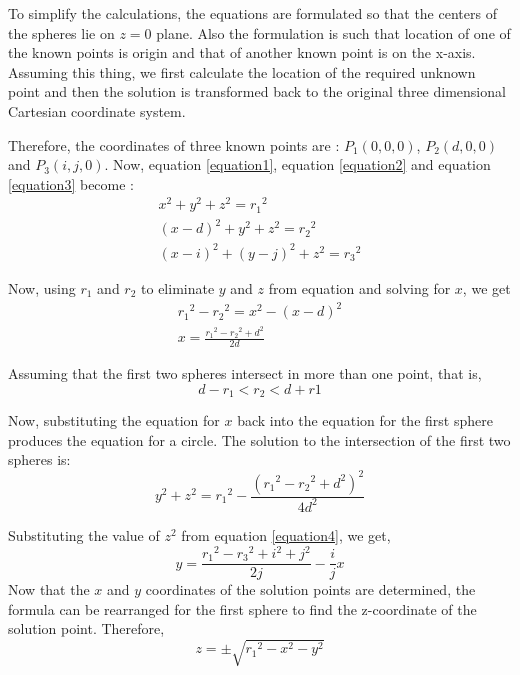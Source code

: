 To simplify the calculations, the equations are formulated so that the centers of the spheres lie on $z=0$ plane. Also the formulation is such that location of one of the known points is origin and that of another known point is on the x-axis. Assuming this thing, we first calculate the location of the required unknown point and then the solution is transformed back to the original three dimensional Cartesian coordinate system.

Therefore, the coordinates of three known points are : $P_1(0,0,0)$, $P_2(d,0,0)$ and $P_3(i,j,0)$. Now, equation \ref{equation1}, equation \ref{equation2} and equation \ref{equation3} become :
\begin{eqnarray}
	\label{equation4}  x^2+y^2+z^2={r_1}^2 \\ 
	\label{equation5} (x-d)^2+y^2+z^2={r_2}^2 \\ 
	\label{equation6} (x-i)^2+(y-j)^2+z^2={r_3}^2 
\end{eqnarray}

Now, using $r_1$ and $r_2$ to eliminate $y$ and $z$ from equation and solving for $x$, we get
\begin{eqnarray}
\nonumber	{r_1}^2-{r_2}^2=x^2-(x-d)^2 \\ 
	x=\frac{{r_1}^2-{r_2}^2+d^2}{2d}
\end{eqnarray}

Assuming that the first two spheres intersect in more than one point, that is,
\begin{equation}
	d-r_1<r_2<d+r1 \nonumber
\end{equation}

Now, substituting the equation for $x$ back into the equation for the first sphere produces the equation for a circle. The solution to the intersection of the first two spheres is:
\begin{equation}
y^2+z^2={r_1}^2-\frac{({r_1}^2-{r_2}^2+d^2)^2}{4d^2} \nonumber
\end{equation}

Substituting the value of $z^2$ from equation \ref{equation4}, we get, 
\begin{equation}
y=\frac{{r_1}^2-{r_3}^2+i^2+j^2}{2j}-\frac{i}{j}x
\end{equation}
Now that the $x$ and $y$ coordinates of the solution points are determined, the formula can be rearranged for the first sphere to find the z-coordinate of the solution point. Therefore,
\begin{equation}
	z=\pm \sqrt{{r_1}^2-x^2-y^2}
\end{equation}

